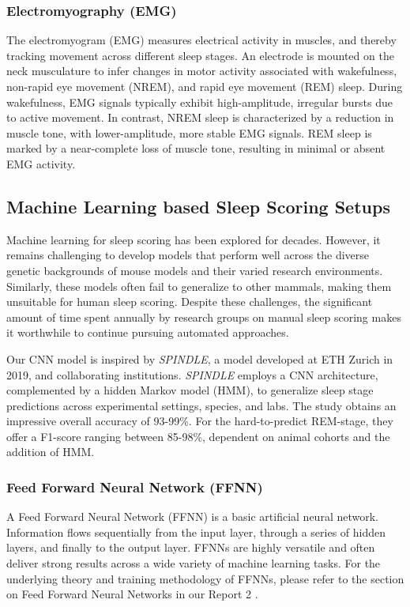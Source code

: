 \documentclass{article}
\begin{document}
\begin{multicols}{2}
\subsubsection*{Electromyography (EMG)}
The electromyogram (EMG) measures electrical activity in muscles, and thereby tracking movement across different sleep stages. An electrode is mounted on the neck musculature to infer changes in motor activity associated with wakefulness, non-rapid eye movement (NREM), and rapid eye movement (REM) sleep. During wakefulness, EMG signals typically exhibit high-amplitude, irregular bursts due to active movement. \cite{noauthor_electromyography_nodate} In contrast, NREM sleep is characterized by a reduction in muscle tone, with lower-amplitude, more stable EMG signals. REM sleep is marked by a near-complete loss of muscle tone, resulting in minimal or absent EMG activity. \cite{noauthor_electromyography_nodate}

\subsection*{Machine Learning based Sleep Scoring Setups}
Machine learning for sleep scoring has been explored for decades. However, it remains challenging to develop models that perform well across the diverse genetic backgrounds of mouse models and their varied research environments. Similarly, these models often fail to generalize to other mammals, making them unsuitable for human sleep scoring. Despite these challenges, the significant amount of time spent annually by research groups on manual sleep scoring makes it worthwhile to continue pursuing automated approaches. \cite{alizadeh_savareh_performance_2018}

Our CNN model is inspired by \textit{SPINDLE}, a model developed at ETH Zurich in 2019, and collaborating institutions. \textit{SPINDLE} employs a CNN architecture, complemented by a hidden Markov model (HMM), to generalize sleep stage predictions across experimental settings, species, and labs. The study obtains an impressive overall accuracy of 93-99\%. For the hard-to-predict REM-stage, they offer a F1-score ranging between 85-98\%, dependent on animal cohorts and the addition of HMM. \cite{miladinovic_SPINDLE_2019}

\subsubsection*{Feed Forward Neural Network (FFNN)} 
A Feed Forward Neural Network (FFNN) is a basic artificial neural network. Information flows sequentially from the input layer, through a series of hidden layers, and finally to the output layer. FFNNs are highly versatile and often deliver strong results across a wide variety of machine learning tasks. For the underlying theory and training methodology of FFNNs, please refer to the section on Feed Forward Neural Networks in our Report 2 \cite{brovold_less_2024}.



\end{multicols}
\end{document}
